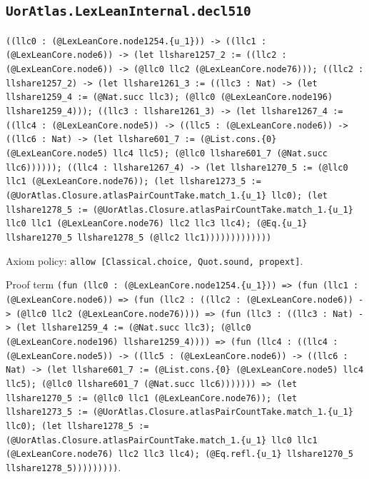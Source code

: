 \documentclass[11pt]{article}
\begin{document}
\subsection*{\texttt{UorAtlas.LexLeanInternal.decl510}}
\noindent\texttt{((llc0 : (@LexLeanCore.node1254.\{u\_1\})) -> ((llc1 : (@LexLeanCore.node6)) -> (let llshare1257\_2 := ((llc2 : (@LexLeanCore.node6)) -> (@llc0 llc2 (@LexLeanCore.node76))); ((llc2 : llshare1257\_2) -> (let llshare1261\_3 := ((llc3 : Nat) -> (let llshare1259\_4 := (@Nat.succ llc3); (@llc0 (@LexLeanCore.node196) llshare1259\_4))); ((llc3 : llshare1261\_3) -> (let llshare1267\_4 := ((llc4 : (@LexLeanCore.node5)) -> ((llc5 : (@LexLeanCore.node6)) -> ((llc6 : Nat) -> (let llshare601\_7 := (@List.cons.\{0\} (@LexLeanCore.node5) llc4 llc5); (@llc0 llshare601\_7 (@Nat.succ llc6)))))); ((llc4 : llshare1267\_4) -> (let llshare1270\_5 := (@llc0 llc1 (@LexLeanCore.node76)); (let llshare1273\_5 := (@UorAtlas.Closure.atlasPairCountTake.match\_1.\{u\_1\} llc0); (let llshare1278\_5 := (@UorAtlas.Closure.atlasPairCountTake.match\_1.\{u\_1\} llc0 llc1 (@LexLeanCore.node76) llc2 llc3 llc4); (@Eq.\{u\_1\} llshare1270\_5 llshare1278\_5 (@llc2 llc1)))))))))))))}\par
\noindent Axiom policy: \texttt{allow [Classical.choice, Quot.sound, propext]}.\par
\noindent Proof term \texttt{(fun (llc0 : (@LexLeanCore.node1254.\{u\_1\})) => (fun (llc1 : (@LexLeanCore.node6)) => (fun (llc2 : ((llc2 : (@LexLeanCore.node6)) -> (@llc0 llc2 (@LexLeanCore.node76)))) => (fun (llc3 : ((llc3 : Nat) -> (let llshare1259\_4 := (@Nat.succ llc3); (@llc0 (@LexLeanCore.node196) llshare1259\_4)))) => (fun (llc4 : ((llc4 : (@LexLeanCore.node5)) -> ((llc5 : (@LexLeanCore.node6)) -> ((llc6 : Nat) -> (let llshare601\_7 := (@List.cons.\{0\} (@LexLeanCore.node5) llc4 llc5); (@llc0 llshare601\_7 (@Nat.succ llc6))))))) => (let llshare1270\_5 := (@llc0 llc1 (@LexLeanCore.node76)); (let llshare1273\_5 := (@UorAtlas.Closure.atlasPairCountTake.match\_1.\{u\_1\} llc0); (let llshare1278\_5 := (@UorAtlas.Closure.atlasPairCountTake.match\_1.\{u\_1\} llc0 llc1 (@LexLeanCore.node76) llc2 llc3 llc4); (@Eq.refl.\{u\_1\} llshare1270\_5 llshare1278\_5)))))))))}.\par
\end{document}
